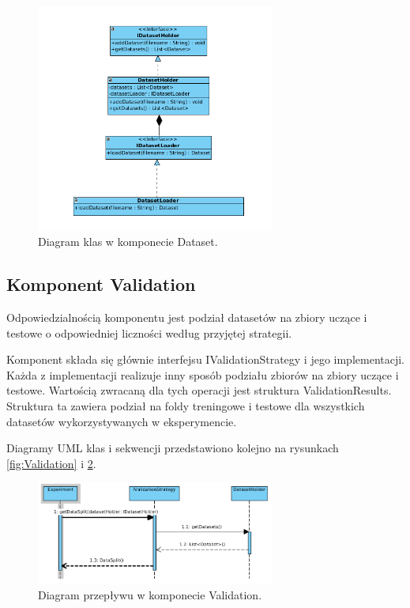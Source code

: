 \documentclass[12pt]{article}
\begin{document}
\begin{figure}[!h]
\centering
	\includegraphics[width=0.7\textwidth]{img/class_diagrams/dataset.png}
	\caption{Diagram klas w komponecie Dataset.}
	\label{fig:classDataset}
\end{figure}
\newpage

\subsection{Komponent Validation}

Odpowiedzialnością komponentu jest podział datasetów na zbiory uczące i testowe o odpowiedniej liczności według przyjętej strategii.

Komponent składa się głównie interfejsu IValidationStrategy i jego implementacji. Każda z implementacji realizuje inny sposób podziału zbiorów na zbiory uczące i testowe. Wartością zwracaną dla tych operacji jest struktura ValidationResults. Struktura ta zawiera podział na foldy treningowe i testowe dla wszystkich datasetów wykorzystywanych w eksperymencie. 

Diagramy UML klas i sekwencji przedstawiono kolejno na rysunkach \ref{fig:Validation} i \ref{fig:sequenceValidation}.

\begin{figure}[!h]
	\centering
	\includegraphics[width=0.7\textwidth]{img/sequenceValidation.png}
	\caption{Diagram przepływu w komponecie Validation.}
	\label{fig:sequenceValidation}
\end{figure}
\end{document}
